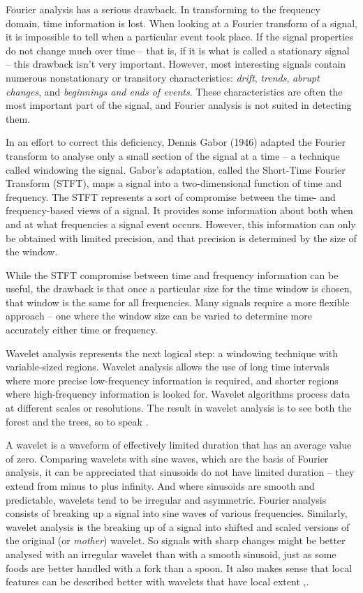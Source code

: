 \documentclass[a4paper,11pt]{report}
\begin{document}
Fourier analysis has a serious drawback. In transforming to the frequency domain, time information is lost. When looking at a Fourier transform of a signal, it is impossible to tell when a particular event took place. If the signal properties do not change much over time -- that is, if it is what is called a stationary signal -- this drawback isn't very important. However, most interesting signals contain numerous nonstationary or transitory characteristics: \emph{drift}, \emph{trends}, \emph{abrupt changes}, and \emph{beginnings and ends of events}. These characteristics are often the most important part of the signal, and Fourier analysis is not suited in detecting them. 

In an effort to correct this deficiency, Dennis Gabor (1946) adapted the Fourier transform to analyse only a small section of the signal at a time -- a technique called windowing the signal. Gabor's adaptation, called the Short-Time Fourier Transform (STFT), maps a signal into a two-dimensional function of time and frequency. The STFT represents a sort of compromise between the time- and frequency-based views of a signal. It provides some information about both when and at what frequencies a signal event occurs. However, this information can only be obtained with limited precision, and that precision is determined by the size of the window.

While the STFT compromise between time and frequency information can be useful, the drawback is that once a particular size for the time window is chosen, that window is the same for all frequencies. Many signals require a more flexible approach -- one where the window size can be varied to determine more accurately either time or frequency.

Wavelet analysis represents the next logical step: a windowing technique with variable-sized regions. Wavelet analysis allows the use of long time intervals where more precise low-frequency information is required, and shorter regions where high-frequency information is looked for. Wavelet algorithms process data at different scales or resolutions. The result in wavelet analysis is to see both the forest and the trees, so to speak \cite{amara}.

A wavelet is a waveform of effectively limited duration that has an average value of zero. Comparing wavelets with sine waves, which are the basis of Fourier analysis, it  can be appreciated that sinusoids do not have limited duration -- they extend from minus to plus infinity. And where sinusoids are smooth and predictable, wavelets tend to be irregular and asymmetric. Fourier analysis consists of breaking up a signal into sine waves of various frequencies. Similarly, wavelet analysis is the breaking up of a signal into shifted and scaled versions of the original (or \emph{mother}) wavelet. So signals with sharp changes might be better analysed with an irregular wavelet than with a smooth sinusoid, just as some foods are better handled with a fork than a spoon. It also makes sense that local features can be described better with wavelets that have local extent \cite{pswbook},\cite{waveletug}.
\end{document}
